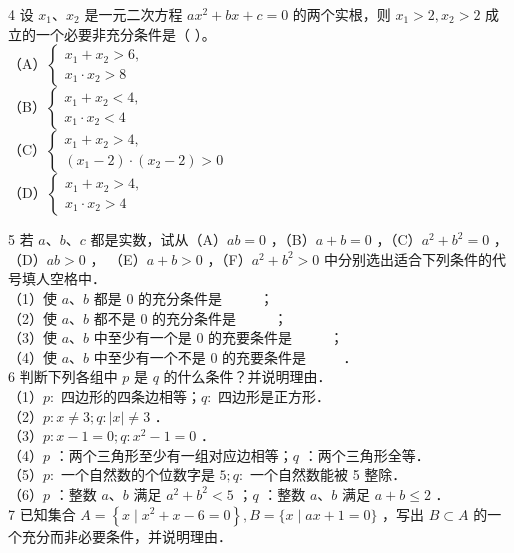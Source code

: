 \documentclass[10pt]{article}
\begin{document}
4 设 \(x_{1} 、 x_{2}\) 是一元二次方程 \(a x^{2}+b x+c=0\) 的两个实根，则 \(x_{1}>2, x_{2}>2\) 成立的一个必要非充分条件是（ ）。\\
（A）\(\left\{\begin{array}{l}x_{1}+x_{2}>6, \\ x_{1} \cdot x_{2}>8\end{array}\right.\)\\
（B）\(\left\{\begin{array}{l}x_{1}+x_{2}<4, \\ x_{1} \cdot x_{2}<4\end{array}\right.\)\\
（C）\(\left\{\begin{array}{l}x_{1}+x_{2}>4, \\ \left(x_{1}-2\right) \cdot\left(x_{2}-2\right)>0\end{array}\right.\)\\
（D）\(\left\{\begin{array}{l}x_{1}+x_{2}>4, \\ x_{1} \cdot x_{2}>4\end{array}\right.\)

5 若 \(a 、 b 、 c\) 都是实数，试从（A）\(a b=0\) ，（B）\(a+b=0\) ，（C）\(a^{2}+b^{2}=0\) ，（D）\(a b>0\) ， （E）\(a+b>0\) ，（F）\(a^{2}+b^{2}>0\) 中分别选出适合下列条件的代号填人空格中．\\
（1）使 \(a 、 b\) 都是 0 的充分条件是 \(\qquad\) ；\\
（2）使 \(a 、 b\) 都不是 0 的充分条件是 \(\qquad\) ；\\
（3）使 \(a 、 b\) 中至少有一个是 0 的充要条件是 \(\qquad\) ；\\
（4）使 \(a 、 b\) 中至少有一个不是 0 的充要条件是 \(\qquad\) ．\\
6 判断下列各组中 \(p\) 是 \(q\) 的什么条件？并说明理由．\\
（1）\(p:\) 四边形的四条边相等；\(q:\) 四边形是正方形．\\
（2）\(p: x \neq 3 ; q:|x| \neq 3\) ．\\
（3）\(p: x-1=0 ; q: x^{2}-1=0\) ．\\
（4）\(p\) ：两个三角形至少有一组对应边相等；\(q\) ：两个三角形全等．\\
（5）\(p:\) 一个自然数的个位数字是 \(5 ; q:\) 一个自然数能被 5 整除．\\
（6）\(p\) ：整数 \(a 、 b\) 满足 \(a^{2}+b^{2}<5\) ；\(q\) ：整数 \(a 、 b\) 满足 \(a+b \leqslant 2\) ．\\
7 已知集合 \(A=\left\{x \mid x^{2}+x-6=0\right\}, B=\{x \mid a x+1=0\}\) ，写出 \(B \subset A\) 的一个充分而非必要条件，并说明理由．
\end{document}
